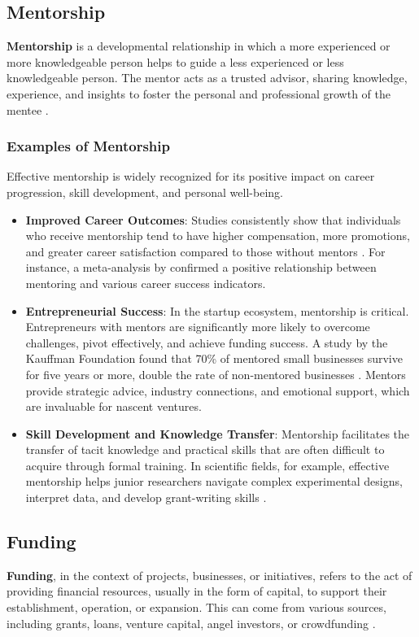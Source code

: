 \documentclass[../Main.tex]{subfiles}
\begin{document}
\subsection{Mentorship}
\textbf{Mentorship} is a developmental relationship in which a more experienced or more knowledgeable person helps to guide a less experienced or less knowledgeable person. The mentor acts as a trusted advisor, sharing knowledge, experience, and insights to foster the personal and professional growth of the mentee \cite{jacobi1991mentorship, nationalacademies2019mentoring}.

\subsubsection*{Examples of Mentorship}
Effective mentorship is widely recognized for its positive impact on career progression, skill development, and personal well-being.
\begin{itemize}
    \item \textbf{Improved Career Outcomes}: Studies consistently show that individuals who receive mentorship tend to have higher compensation, more promotions, and greater career satisfaction compared to those without mentors \cite{ragins1999review}. For instance, a meta-analysis by \cite{underhill2006mentoring} confirmed a positive relationship between mentoring and various career success indicators.
    \item \textbf{Entrepreneurial Success}: In the startup ecosystem, mentorship is critical. Entrepreneurs with mentors are significantly more likely to overcome challenges, pivot effectively, and achieve funding success. A study by the Kauffman Foundation found that 70\% of mentored small businesses survive for five years or more, double the rate of non-mentored businesses \cite{kauffman2013mentoring}. Mentors provide strategic advice, industry connections, and emotional support, which are invaluable for nascent ventures.
    \item \textbf{Skill Development and Knowledge Transfer}: Mentorship facilitates the transfer of tacit knowledge and practical skills that are often difficult to acquire through formal training. In scientific fields, for example, effective mentorship helps junior researchers navigate complex experimental designs, interpret data, and develop grant-writing skills \cite{nationalacademies2019mentoring}.
\end{itemize}

\subsection{Funding}
\textbf{Funding}, in the context of projects, businesses, or initiatives, refers to the act of providing financial resources, usually in the form of capital, to support their establishment, operation, or expansion. This can come from various sources, including grants, loans, venture capital, angel investors, or crowdfunding \cite{bruneel2010funding, lerner2018venture}.
\end{document}
